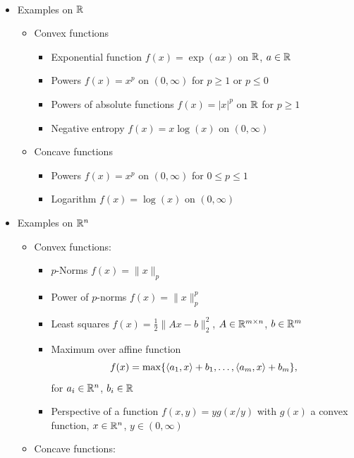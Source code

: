 \begin{example}\
	\begin{itemize}
        \item Examples on $\mathbb{R}$
        \begin{itemize}
            \item Convex functions
            \begin{itemize}
                \item Exponential function $f(x)=\exp(ax)$ on $\mathbb{R}$, $a\in\mathbb{R}$
                \item Powers $f(x)=x^p$ on $(0,\infty)$ for $p\geq 1$ or $p\leq 0$
                \item Powers of absolute functions $f(x)=\vert x\vert^p$ on $\mathbb{R}$ for $p\geq 1$
                \item Negative entropy $f(x)=x\log(x)$ on $(0,\infty)$
            \end{itemize}
            \item Concave functions
            \begin{itemize}
                \item Powers $f(x)=x^p$ on $(0,\infty)$ for $0\leq p\leq1$
                \item Logarithm $f(x)=\log(x)$ on $(0,\infty)$
            \end{itemize}
        \end{itemize}
        \item Examples on $\mathbb{R}^n$
        \begin{itemize}
            \item Convex functions:
            \begin{itemize}
                \item $p$-Norms $f(x)=\|x\|_p$
                \item Power of $p$-norms $f(x)=\|x\|_p^p$
                \item Least squares $f(x)=\frac12\|Ax-b\|_2^2$, $A\in\mathbb{R}^{m\times n}$, $b\in \mathbb{R}^m$
                \item Maximum over affine function
                    \[
                        f(x)=\max\{\left\langle a_1 , x\right\rangle+b_1,\ldots,\left\langle a_m , x\right\rangle+b_m\},
                    \]
                for $a_i\in\mathbb{R}^n$, $b_i\in\mathbb{R}$
                \item Perspective of a function $f(x,y)=yg(x/y)$ with $g(x)$ a convex function, $x \in \mathbb{R}^n$, $y \in (0,\infty)$
            \end{itemize}
            \item Concave functions:

\end{itemize}
\end{itemize}
\end{example}
